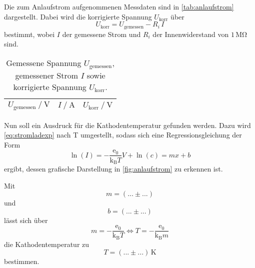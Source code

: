 Die zum Anlaufstrom aufgenommenen Messdaten sind in \autoref{tab:anlaufstrom} dargestellt.
Dabei wird die korrigierte Spannung $U_\text{korr}$ über
\begin{equation*}
    U_\text{korr} = U_\text{gemessen} - R_i \, I
\end{equation*} 
bestimmt, wobei $I$ der gemessene Strom und $R_i$ der Innenwiderstand von $1 \,\unit{\mega\ohm}$ sind.

\begin{table}
    \centering
    \caption{Gemessene Spannung $U_\text{gemessen}$, gemessener Strom $I$ sowie korrigierte Spannung $U_\text{korr}$.}
    \label{tab:anlaufstrom}
    \begin{tabular}{S S S}
        \toprule
        {$U_\text{gemessen} \mathbin{/} \unit{\volt}$} & {$I \mathbin{/} \unit{\ampere}$} & {$U_\text{korr} \mathbin{/} \unit{\volt}$} \\
        \midrule




        \bottomrule
    \end{tabular}
\end{table}

Nun soll ein Ausdruck für die Kathodentemperatur gefunden werden.
Dazu wird \eqref{eq:stromladexp} nach T umgestellt, sodass sich eine Regressionsgleichung der Form
\begin{equation*}
    \ln(I) = -\dfrac{\text{e}_0}{\text{k}_\text{B} T} V + \ln(c) = m x + b
\end{equation*}
ergibt, dessen grafische Darstellung in \autoref{fig:anlaufstrom} zu erkennen ist.


Mit
\begin{equation*}
    m = (... \pm ...)
\end{equation*}
und
\begin{equation*}
    b = (... \pm ...)
\end{equation*}
lässt sich über
\begin{equation*}
    m = -\dfrac{\text{e}_0}{\text{k}_\text{B} T} \Leftrightarrow T = - \dfrac{\text{e}_0}{\text{k}_\text{B} m}
\end{equation*}
die Kathodentemperatur zu
\begin{equation*}
    T = (... \pm ...) \,\unit{\kelvin}
\end{equation*}
bestimmen. 


